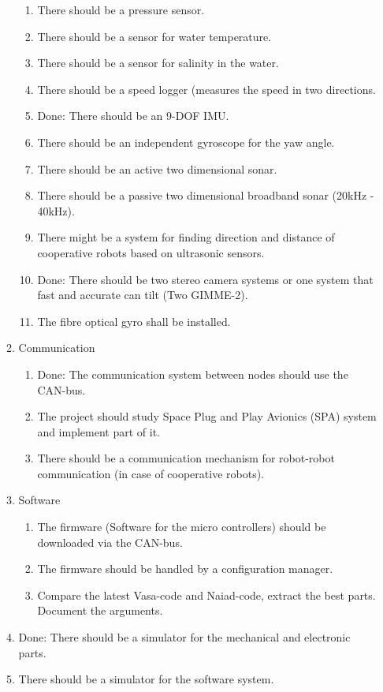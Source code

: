 \begin{enumerate}
\begin{enumerate}
\begin{enumerate}
\item There should be a pressure sensor. 
\item There should be a sensor for water temperature.
\item There should be a sensor for salinity in the water.
\item There should be a speed logger (measures the speed in two directions.
\item {\color{green}Done: There should be an 9-DOF IMU.}
\item There should be an independent gyroscope for the yaw angle.
\item There should be an active two dimensional sonar.
\item There should be a passive two dimensional broadband sonar (20kHz  - 40kHz).
\item There might be a system for finding direction and distance of cooperative robots based on ultrasonic sensors.
\item {\color{green}Done: There should be two stereo camera systems or one system that fast and accurate can tilt (Two GIMME-2).}
\item The fibre optical gyro shall be installed.
\end{enumerate}
\item Communication
\begin{enumerate}
\item {\color{green}Done: The communication system between nodes should use the CAN-bus.}
\item The project should study Space Plug and Play Avionics (SPA) system and implement part of it.
\item There should be a communication mechanism for robot-robot communication (in case of cooperative robots).
\end{enumerate}
\item Software
\begin{enumerate}
\item The firmware (Software for the micro controllers) should be downloaded via the CAN-bus.
\item The firmware should be handled by a configuration manager.
\item Compare the latest Vasa-code and Naiad-code, extract the best parts. Document the arguments.
\end{enumerate}
\item {\color{green}Done: There should be a simulator for the mechanical and electronic parts.}
\item There should be a simulator for the software system.

\end{enumerate}
\end{enumerate}
